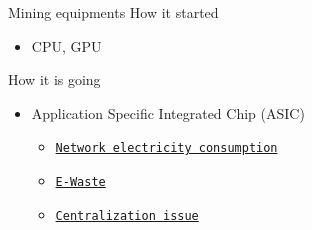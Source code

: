 \documentclass{beamer}
\begin{document}
\begin{frame}{Mining equipments}
How it started
\begin{itemize}
  \item CPU, GPU
\end{itemize}
How it is going
\begin{itemize}
  \item Application Specific Integrated Chip (ASIC)
  \begin{itemize}
  \item  \href{https://digiconomist.net/bitcoin-energy-consumption}{\texttt{Network electricity consumption}}
  \item  \href{https://www.bitmain.com/}{\texttt{E-Waste}}
  \item \href{https://mempool.space/graphs/mining/pools}{\texttt{Centralization issue}}
  \end{itemize}
\end{itemize}
\end{frame}
\end{document}
